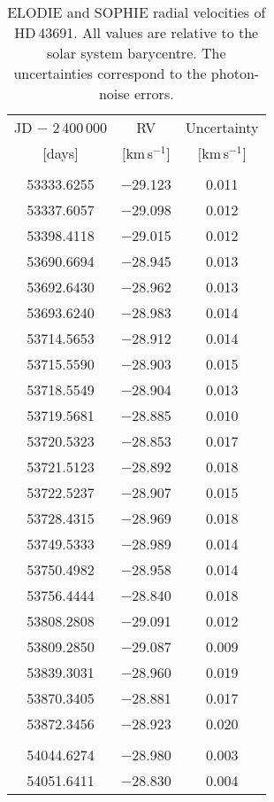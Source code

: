 \documentclass{aa}
\begin{document}
\begin{table}[t!]
\centering
  \caption[]{ELODIE and SOPHIE radial velocities of HD\,43691. All values
             are relative to the solar system barycentre. The uncertainties
	     correspond to the photon-noise errors.}
  \label{rad_vel1}
\begin{tabular}{ccc}
\hline
\hline
\noalign{\smallskip}
JD $-$ 2\,400\,000 & RV              & Uncertainty     \\
$[$days$]$         & $[$km\,s$^{-1}]$ & $[$km\,s$^{-1}]$ \\
\noalign{\smallskip}
\hline
\multicolumn{3}{c}{ELODIE measurements} \\
\hline
\noalign{\smallskip}
53333.6255 & $-$29.123 & 0.011 \\
53337.6057 & $-$29.098 & 0.012 \\
53398.4118 & $-$29.015 & 0.012 \\
53690.6694 & $-$28.945 & 0.013 \\
53692.6430 & $-$28.962 & 0.013 \\
53693.6240 & $-$28.983 & 0.014 \\
53714.5653 & $-$28.912 & 0.014 \\
53715.5590 & $-$28.903 & 0.015 \\
53718.5549 & $-$28.904 & 0.013 \\
53719.5681 & $-$28.885 & 0.010 \\
53720.5323 & $-$28.853 & 0.017 \\
53721.5123 & $-$28.892 & 0.018 \\
53722.5237 & $-$28.907 & 0.015 \\
53728.4315 & $-$28.969 & 0.018 \\
53749.5333 & $-$28.989 & 0.014 \\
53750.4982 & $-$28.958 & 0.014 \\
53756.4444 & $-$28.840 & 0.018 \\
53808.2808 & $-$29.091 & 0.012 \\
53809.2850 & $-$29.087 & 0.009 \\
53839.3031 & $-$28.960 & 0.019 \\
53870.3405 & $-$28.881 & 0.017 \\
53872.3456 & $-$28.923 & 0.020 \\
\noalign{\smallskip}
\hline
\multicolumn{3}{c}{SOPHIE measurements} \\
\hline
\noalign{\smallskip}
54044.6274 & $-$28.980 & 0.003 \\
54051.6411 & $-$28.830 & 0.004 \\

\end{tabular}
\end{table}
\end{document}
